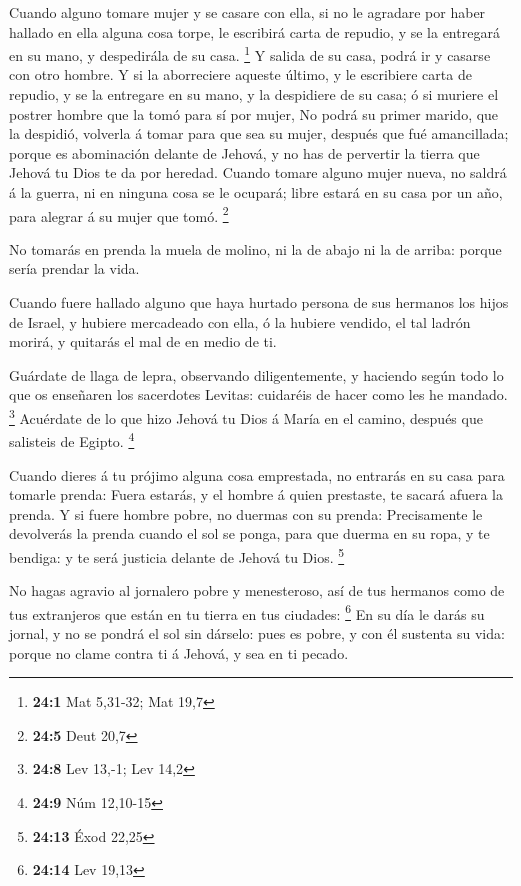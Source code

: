  Cuando alguno tomare mujer y se casare con ella, si no le
agradare por haber hallado en ella alguna cosa torpe, le escribirá carta
de repudio, y se la entregará en su mano, y despedirála de su casa.
\footnote{\textbf{24:1} Mat 5,31-32; Mat 19,7}  Y salida de
su casa, podrá ir y casarse con otro hombre.  Y si la
aborreciere aqueste último, y le escribiere carta de repudio, y se la
entregare en su mano, y la despidiere de su casa; ó si muriere el
postrer hombre que la tomó para sí por mujer,  No podrá su
primer marido, que la despidió, volverla á tomar para que sea su mujer,
después que fué amancillada; porque es abominación delante de Jehová, y
no has de pervertir la tierra que Jehová tu Dios te da por heredad.
 Cuando tomare alguno mujer nueva, no saldrá á la guerra, ni
en ninguna cosa se le ocupará; libre estará en su casa por un año, para
alegrar á su mujer que tomó. \footnote{\textbf{24:5} Deut 20,7}

 No tomarás en prenda la muela de molino, ni la de abajo ni
la de arriba: porque sería prendar la vida.

 Cuando fuere hallado alguno que haya hurtado persona de sus
hermanos los hijos de Israel, y hubiere mercadeado con ella, ó la
hubiere vendido, el tal ladrón morirá, y quitarás el mal de en medio de
ti.

 Guárdate de llaga de lepra, observando diligentemente, y
haciendo según todo lo que os enseñaren los sacerdotes Levitas:
cuidaréis de hacer como les he mandado. \footnote{\textbf{24:8} Lev
  13,-1; Lev 14,2}  Acuérdate de lo que hizo Jehová tu Dios
á María en el camino, después que salisteis de Egipto. \footnote{\textbf{24:9}
  Núm 12,10-15}

 Cuando dieres á tu prójimo alguna cosa emprestada, no
entrarás en su casa para tomarle prenda:  Fuera estarás, y
el hombre á quien prestaste, te sacará afuera la prenda.  Y
si fuere hombre pobre, no duermas con su prenda: 
Precisamente le devolverás la prenda cuando el sol se ponga, para que
duerma en su ropa, y te bendiga: y te será justicia delante de Jehová tu
Dios. \footnote{\textbf{24:13} Éxod 22,25}

 No hagas agravio al jornalero pobre y menesteroso, así de
tus hermanos como de tus extranjeros que están en tu tierra en tus
ciudades: \footnote{\textbf{24:14} Lev 19,13}  En su día le
darás su jornal, y no se pondrá el sol sin dárselo: pues es pobre, y con
él sustenta su vida: porque no clame contra ti á Jehová, y sea en ti
pecado.


